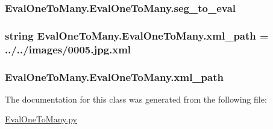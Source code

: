 \subsubsection[{seg\+\_\+to\+\_\+eval}]{\setlength{\rightskip}{0pt plus 5cm}Eval\+One\+To\+Many.\+Eval\+One\+To\+Many.\+seg\+\_\+to\+\_\+eval}\label{class_eval_one_to_many_1_1_eval_one_to_many_a8b1c055143abffdd68385d0d8592a8f9}
\hypertarget{class_eval_one_to_many_1_1_eval_one_to_many_ae9ba6a76f1f0488e51746a887fb8895e}{}
\subsubsection[{xml\+\_\+path}]{\setlength{\rightskip}{0pt plus 5cm}string Eval\+One\+To\+Many.\+Eval\+One\+To\+Many.\+xml\+\_\+path = \textquotesingle{}../../images/0005.jpg.\+xml\textquotesingle{}\hspace{0.3cm}{\ttfamily [static]}}\label{class_eval_one_to_many_1_1_eval_one_to_many_ae9ba6a76f1f0488e51746a887fb8895e}
\hypertarget{class_eval_one_to_many_1_1_eval_one_to_many_a136344598ed0090ca9fc43cd7104ea5c}{}
\subsubsection[{xml\+\_\+path}]{\setlength{\rightskip}{0pt plus 5cm}Eval\+One\+To\+Many.\+Eval\+One\+To\+Many.\+xml\+\_\+path}\label{class_eval_one_to_many_1_1_eval_one_to_many_a136344598ed0090ca9fc43cd7104ea5c}


The documentation for this class was generated from the following file\+:\begin{DoxyCompactItemize}
\item 
\hyperlink{_eval_one_to_many_8py}{Eval\+One\+To\+Many.\+py}\end{DoxyCompactItemize}
